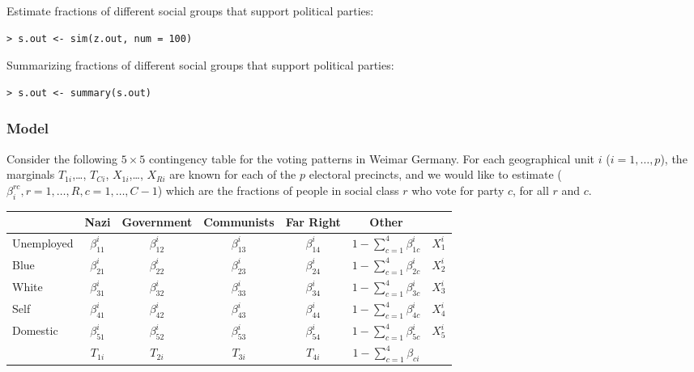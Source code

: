 \begin{enumerate}
Estimate fractions of different social groups that support political parties:

\begin{verbatim}
> s.out <- sim(z.out, num = 100) 
\end{verbatim}

Summarizing fractions of different social groups that support political parties:
\begin{verbatim}
> s.out <- summary(s.out) 
\end{verbatim}

\end{enumerate}

\clearpage

\subsubsection{Model}
Consider the following $5 \times 5$ contingency table for the voting
patterns in Weimar Germany.  For each geographical unit $i$ ($i = 1,
\dots, p$), the marginals $T_{1i}$,\dots, $T_{Ci}$, $X_{1i}$,\dots,
$X_{Ri}$ are known for each of the $p$ electoral precincts, and we
would like to estimate ($\beta_i^{rc}, r=1,\dots,R, c=1,\dots,C-1$)
which are the fractions of people in social class $r$ who vote for
party $c$, for all $r$ and $c$.
\begin{table}[!h]
  \begin{center}
    \begin{tabular}{l|ccccc|c}
      & Nazi  & Government & Communists & Far Right & Other         \\
      \hline
      Unemployed & $\beta_{11}^{i}$  & $\beta_{12}^{i}$ & $\beta_{13}^{i}$  & $\beta_{14}^{i}$  & $1-\sum_{c=1}^4 \beta_{1c}^i$ & $X_1^i$   \\
      Blue  & $\beta_{21}^{i}$  & $\beta_{22}^{i}$ & $\beta_{23}^{i}$  & $\beta_{24}^{i}$  & $1-\sum_{c=1}^4 \beta_{2c}^i$ & $X_2^i$   \\
      White  & $\beta_{31}^{i}$  & $\beta_{32}^{i}$ & $\beta_{33}^{i}$  & $\beta_{34}^{i}$  & $1-\sum_{c=1}^4 \beta_{3c}^i$ & $X_3^i$   \\
      Self  & $\beta_{41}^{i}$  & $\beta_{42}^{i}$ & $\beta_{43}^{i}$  & $\beta_{44}^{i}$  & $1-\sum_{c=1}^4 \beta_{4c}^i$ & $X_4^i$   \\
      Domestic  & $\beta_{51}^{i}$  & $\beta_{52}^{i}$ & $\beta_{53}^{i}$  & $\beta_{54}^{i}$  & $1-\sum_{c=1}^4 \beta_{5c}^i$ & $X_5^i$   \\
      \hline
      & $T_{1i}$ & $T_{2i}$  & $T_{3i}$      & $T_{4i}$  & $1-\sum_{c=1}^4 \beta_{ci}$
    \end{tabular}
  \end{center}
\end{table}

